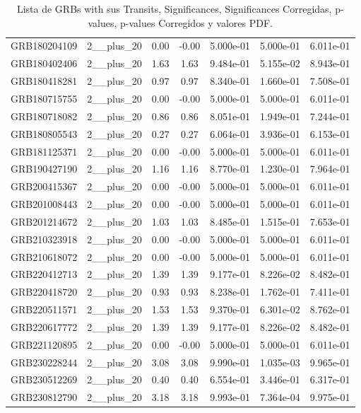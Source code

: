 \documentclass[12pt]{article}
\begin{document}
\begin{table}[h!]
{\begin{tabular}{l c c c c c c}
GRB180204109 & 2__plus_20 & 0.00 & -0.00 & 5.000e-01 & 5.000e-01 & 6.011e-01 \\
GRB180402406 & 2__plus_20 & 1.63 & 1.63 & 9.484e-01 & 5.155e-02 & 8.943e-01 \\
GRB180418281 & 2__plus_20 & 0.97 & 0.97 & 8.340e-01 & 1.660e-01 & 7.508e-01 \\
GRB180715755 & 2__plus_20 & 0.00 & -0.00 & 5.000e-01 & 5.000e-01 & 6.011e-01 \\
GRB180718082 & 2__plus_20 & 0.86 & 0.86 & 8.051e-01 & 1.949e-01 & 7.244e-01 \\
GRB180805543 & 2__plus_20 & 0.27 & 0.27 & 6.064e-01 & 3.936e-01 & 6.153e-01 \\
GRB181125371 & 2__plus_20 & 0.00 & -0.00 & 5.000e-01 & 5.000e-01 & 6.011e-01 \\
GRB190427190 & 2__plus_20 & 1.16 & 1.16 & 8.770e-01 & 1.230e-01 & 7.964e-01 \\
GRB200415367 & 2__plus_20 & 0.00 & -0.00 & 5.000e-01 & 5.000e-01 & 6.011e-01 \\
GRB201008443 & 2__plus_20 & 0.00 & -0.00 & 5.000e-01 & 5.000e-01 & 6.011e-01 \\
GRB201214672 & 2__plus_20 & 1.03 & 1.03 & 8.485e-01 & 1.515e-01 & 7.653e-01 \\
GRB210323918 & 2__plus_20 & 0.00 & -0.00 & 5.000e-01 & 5.000e-01 & 6.011e-01 \\
GRB210618072 & 2__plus_20 & 0.00 & -0.00 & 5.000e-01 & 5.000e-01 & 6.011e-01 \\
GRB220412713 & 2__plus_20 & 1.39 & 1.39 & 9.177e-01 & 8.226e-02 & 8.482e-01 \\
GRB220418720 & 2__plus_20 & 0.93 & 0.93 & 8.238e-01 & 1.762e-01 & 7.411e-01 \\
GRB220511571 & 2__plus_20 & 1.53 & 1.53 & 9.370e-01 & 6.301e-02 & 8.762e-01 \\
GRB220617772 & 2__plus_20 & 1.39 & 1.39 & 9.177e-01 & 8.226e-02 & 8.482e-01 \\
GRB221120895 & 2__plus_20 & 0.00 & -0.00 & 5.000e-01 & 5.000e-01 & 6.011e-01 \\
GRB230228244 & 2__plus_20 & 3.08 & 3.08 & 9.990e-01 & 1.035e-03 & 9.965e-01 \\
GRB230512269 & 2__plus_20 & 0.40 & 0.40 & 6.554e-01 & 3.446e-01 & 6.317e-01 \\
GRB230812790 & 2__plus_20 & 3.18 & 3.18 & 9.993e-01 & 7.364e-04 & 9.975e-01 \\
\bottomrule
\end{tabular}%
}
\caption{Lista de GRBs with sus Transits, Significances, Significances Corregidas, p-values, p-values Corregidos y valores PDF.}
\end{table}
\end{document}
